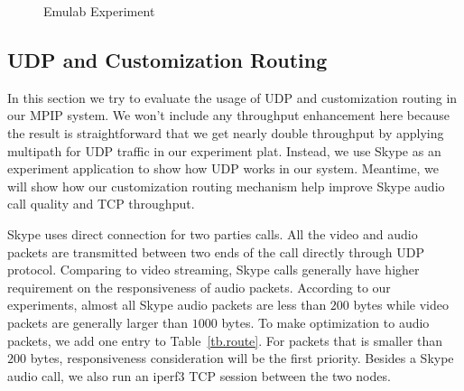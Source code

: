\begin{figure}[htb]
\caption{Emulab Experiment}
\label{fig.emulab}
\end{figure}


\subsection{UDP and Customization Routing}
\label{sec:udp}

In this section we try to evaluate the usage of UDP and customization routing in our MPIP system. We won't include any throughput enhancement here because the result is straightforward that we get nearly double throughput by applying multipath for UDP traffic in our experiment plat. Instead, we use Skype as an experiment application to show how UDP works in our system. Meantime, we will show how our customization routing mechanism help improve Skype audio call quality and TCP throughput.

Skype uses direct connection for two parties calls. All the video and audio packets are transmitted between two ends of the call directly through UDP protocol. Comparing to video streaming, Skype calls generally have higher requirement on the responsiveness of audio packets. According to our experiments, almost all Skype audio packets are less than $200$ bytes while video packets are generally larger than $1000$ bytes. To make optimization to audio packets, we add one entry to Table~\ref{tb.route}. For packets that is smaller than $200$ bytes, responsiveness consideration will be the first priority. Besides a Skype audio call, we also run an iperf3 TCP session between the two nodes.

